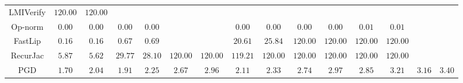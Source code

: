 \begin{table*}
{\begin{tabular}{c|c|c|c|c|c|c|c|c|c|c|c|c|c|c}
    LMIVerify &      $120.00$ &      $120.00$ &               &               &               &               &               &               &               &               &               &               &               &               \\
      Op-norm &        $0.00$ &        $0.00$ &        $0.00$ &        $0.00$ &               &               &        $0.00$ &        $0.00$ &        $0.00$ &        $0.00$ &        $0.01$ &        $0.01$ &               &               \\
      FastLip &        $0.16$ &        $0.16$ &        $0.67$ &        $0.69$ &               &               &       $20.61$ &       $25.84$ &      $120.00$ &      $120.00$ &      $120.00$ &      $120.00$ &               &               \\
     RecurJac &        $5.87$ &        $5.62$ &       $29.77$ &       $28.10$ &      $120.00$ &      $120.00$ &      $119.21$ &      $120.00$ &      $120.00$ &      $120.00$ &      $120.00$ &      $120.00$ &               &               \\
\hline
          PGD &        $1.70$ &        $2.04$ &        $1.91$ &        $2.25$ &        $2.67$ &        $2.96$ &        $2.11$ &        $2.33$ &        $2.74$ &        $2.97$ &        $2.85$ &        $3.21$ &        $3.16$ &        $3.40$ \\

    \bottomrule
    \end{tabular}
    \label{table:exp-A-average-radius-time-mnist-1}
    }
\end{table*}
        

